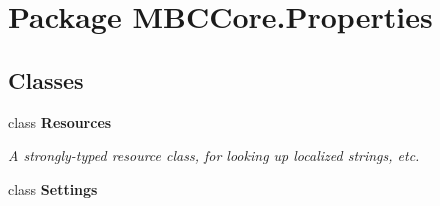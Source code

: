 \hypertarget{namespace_m_b_c_core_1_1_properties}{\section{Package M\-B\-C\-Core.\-Properties}
\label{namespace_m_b_c_core_1_1_properties}
}
\subsection*{Classes}
\begin{DoxyCompactItemize}
\item 
class {\bfseries Resources}
\begin{DoxyCompactList}\small\item\em A strongly-\/typed resource class, for looking up localized strings, etc. \end{DoxyCompactList}\item 
class {\bfseries Settings}
\end{DoxyCompactItemize}
